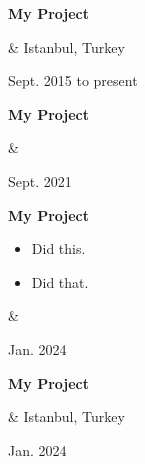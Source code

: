 \documentclass[10pt, letterpaper]{article}
\newenvironment{highlights}{
        \begin{itemize}[
                topsep=0pt,
                parsep=0.10 cm,
                partopsep=0pt,
                itemsep=0pt,
                after=\vspace{-1\baselineskip},
                leftmargin=0.4 cm + 3pt
            ]
    }{
        \end{itemize}
    } %
\let\originalTabularx\tabularx
\let\originalEndTabularx\endtabularx
\renewenvironment{tabularx}{\bgroup\centering\originalTabularx}{\originalEndTabularx\par\egroup}
\begin{document}
        \vspace{0.2 cm}
        \begin{tabularx}{
            \textwidth-0.4 cm-0.13cm
        }{
            K{0.2 cm}
            R{4.1 cm}
        }
            \textbf{My Project}

            \vspace{0.10 cm}

            &
            Istanbul, Turkey

            Sept. 2015 to present
        \end{tabularx}


        \vspace{0.2 cm}
        \begin{tabularx}{
            \textwidth-0.4 cm-0.13cm
        }{
            K{0.2 cm}
            R{4.1 cm}
        }
            \textbf{My Project}

            \vspace{0.10 cm}

            &
            

            Sept. 2021
        \end{tabularx}


        \vspace{0.2 cm}
        \begin{tabularx}{
            \textwidth-0.4 cm-0.13cm
        }{
            K{0.2 cm}
            R{4.1 cm}
        }
            \textbf{My Project}

            \vspace{0.10 cm}

            \begin{highlights}
                \item Did this.
                \item Did that.
            \end{highlights}
            &
            

            Jan. 2024
        \end{tabularx}


        \vspace{0.2 cm}
        \begin{tabularx}{
            \textwidth-0.4 cm-0.13cm
        }{
            K{0.2 cm}
            R{4.1 cm}
        }
            \textbf{My Project}

            \vspace{0.10 cm}

            &
            Istanbul, Turkey

            Jan. 2024
        \end{tabularx}
\end{document}
